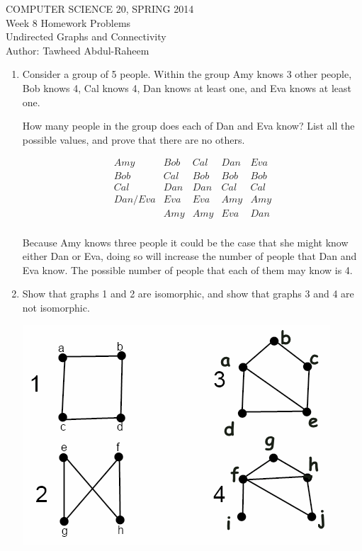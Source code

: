 \documentclass[12pt]{article}
\begin{document}
\begin{center}
COMPUTER SCIENCE 20, SPRING 2014 \\
Week 8 Homework Problems\\
Undirected Graphs and Connectivity \\
Author: Tawheed Abdul-Raheem
\end{center}

\smallskip

\begin{enumerate}
\item Consider a group of 5 people. Within the group Amy knows 3 other people, Bob knows 4, Cal knows 4, Dan knows at least one, and Eva knows at least one.

How many people in the group does each of Dan and Eva know? List all the possible values, and prove that there are no others.

\begin{displaymath}
\begin{array}{|c|c|c|c|c|}
    Amy & Bob &  Cal & Dan & Eva \\
\hline
Bob & Cal  &  Bob &  Bob & Bob   \\
Cal  & Dan  &  Dan &  Cal & Cal   \\
Dan / Eva  & Eva  &  Eva &  Amy & Amy   \\
 & Amy  &  Amy &  Eva &  Dan \\
\end{array}
\end{displaymath}

Because Amy knows three people it could be the case that she might know either Dan or Eva, doing so will increase the number of people that Dan and Eva know. The possible number of people that each of them may know is 4. 
\item Show that graphs 1 and 2 are isomorphic, and show that graphs 3 and 4 are not isomorphic.

\begin{center}
\includegraphics[scale=0.8]{sample.png}
\end{center}


\end{enumerate}
\end{document}
